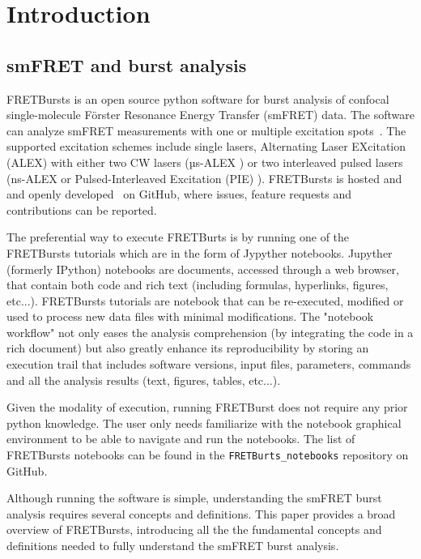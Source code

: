 \section{Introduction}

\subsection{smFRET and burst analysis}

FRETBursts is an open source python software for burst analysis of confocal 
single-molecule Förster Resonance Energy Transfer (smFRET) data. The software can analyze smFRET measurements
with one or multiple excitation spots~\cite{Ingargiola_2013}. The supported 
excitation schemes include single lasers, Alternating Laser EXcitation (ALEX) with either two CW lasers (µs-ALEX \cite{Kapanidis_2005}) 
or two interleaved pulsed lasers (ns-ALEX \cite{16287971} or Pulsed-Interleaved Excitation (PIE) \cite{M_ller_2005}). 
FRETBursts is hosted and and openly developed~\cite{Prli__2012} on GitHub, where
issues, feature requests and contributions can be reported.

The preferential way to execute FRETBurts is by running one of the
FRETBursts tutorials which are in the form of Jypyther notebooks.
Jupyther (formerly IPython) notebooks are documents, 
accessed through a web browser, that contain both code and 
rich text (including formulas, hyperlinks, figures, etc...).
FRETBursts tutorials are notebook that can be re-executed,
modified or used to process new data files with minimal modifications.
The "notebook workflow"\cite{Shen_2014} not only eases 
the analysis comprehension (by integrating the code in a rich document)
but also greatly enhance its reproducibility by storing an execution trail
that includes software versions, input files, parameters, commands and all
the analysis results (text, figures, tables, etc...).

Given the modality of execution, running FRETBurst does not require
any prior python knowledge. The user only needs familiarize with the
notebook graphical environment to be able to navigate and run the notebooks.
The list of FRETBursts notebooks can be found in the 
\verb|FRETBurts_notebooks| repository on GitHub.

Although running the software is simple, understanding the smFRET 
burst analysis requires several concepts and definitions.
This paper provides a broad overview of FRETBursts, introducing all the
the fundamental concepts and definitions needed to fully understand the 
smFRET burst analysis. 

